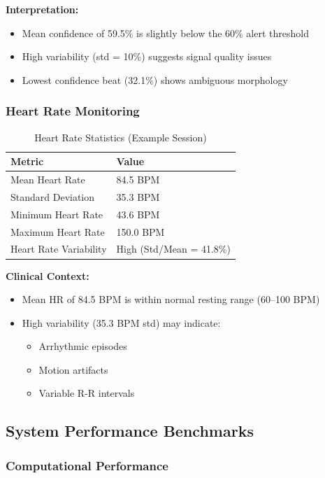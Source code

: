 \documentclass[12pt,a4paper]{article}
\begin{document}
\textbf{Interpretation:}
\begin{itemize}
    \item Mean confidence of 59.5\% is slightly below the 60\% alert threshold
    \item High variability (std = 10\%) suggests signal quality issues
    \item Lowest confidence beat (32.1\%) shows ambiguous morphology
\end{itemize}

\subsubsection{Heart Rate Monitoring}

\begin{table}[H]
\centering
\begin{tabular}{@{}ll@{}}
\toprule
\textbf{Metric} & \textbf{Value} \\ 
\midrule
Mean Heart Rate & 84.5 BPM \\
Standard Deviation & 35.3 BPM \\
Minimum Heart Rate & 43.6 BPM \\
Maximum Heart Rate & 150.0 BPM \\
Heart Rate Variability & High (Std/Mean = 41.8\%) \\
\bottomrule
\end{tabular}
\caption{Heart Rate Statistics (Example Session)}
\label{tab:heart_rate}
\end{table}

\textbf{Clinical Context:}
\begin{itemize}
    \item Mean HR of 84.5 BPM is within normal resting range (60--100 BPM)
    \item High variability (35.3 BPM std) may indicate:
    \begin{itemize}
        \item Arrhythmic episodes
        \item Motion artifacts
        \item Variable R-R intervals
    \end{itemize}
\end{itemize}

\subsection{System Performance Benchmarks}

\subsubsection{Computational Performance}
\end{document}
